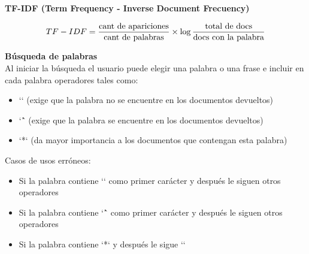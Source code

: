 \documentclass{beamer}
\begin{document}
\begin{frame}
 \begin{flushleft}
\Large{\textbf{TF-IDF (Term Frequency - Inverse Document Frecuency)}}
\end{flushleft}
\begin{center}
\begin{equation}
TF-IDF = \frac{\textup{cant de apariciones}}{\textup{cant de palabras}}\times\log\frac{\textup{total de docs}}{\textup{docs con la palabra}}
\end{equation}
\end{center}
\end{frame}

\begin{frame}
 \begin{flushleft}
\Large {\textbf{Búsqueda de palabras}}\linebreak \\
\large {Al iniciar la búsqueda el usuario puede elegir una palabra o una frase e incluir en cada palabra operadores tales como:}

\begin{itemize}
\item\large{ `\textexclamdown` (exige que la palabra no se encuentre en los documentos devueltos)}
\item\large{`\^` (exige que la palabra se encuentre en los documentos devueltos)
}
\item\large{`*` (da mayor importancia a los documentos que contengan esta palabra)
}
\end{itemize}
\end{flushleft}
\end{frame}

\begin{frame}
 \begin{flushleft}
\Large {Casos de usos erróneos:}

\begin{itemize}
\item\large{ Si la palabra contiene `\textexclamdown` como primer carácter y después le siguen otros operadores}
\item\large{Si la palabra contiene `\^` como primer carácter y después le siguen otros operadores}
\item\large{Si la palabra contiene `*` y después le sigue `\textexclamdown`}
\end{itemize}

\end{flushleft}
\end{frame}
\end{document}
